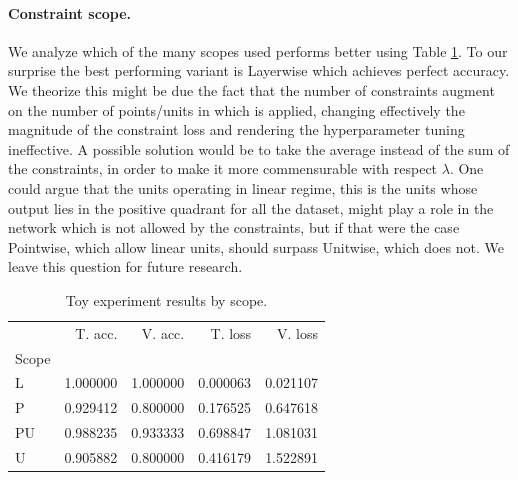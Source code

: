 \paragraph{Constraint scope.} We analyze which of the many scopes used performs better using Table \ref{tab:scopes}. To our surprise the best performing variant is Layerwise which achieves perfect accuracy. We theorize this might be due the fact that the number of constraints augment on the number of points/units in which is applied, changing effectively the magnitude of the constraint loss and rendering the hyperparameter tuning ineffective. A possible solution would be to take the average instead of the sum of the constraints, in order to make it more commensurable with respect $\lambda$. One could argue that the units operating in linear regime, this is the units whose output lies in the positive quadrant for all the dataset, might play a role in the network which is not allowed by the constraints, but if that were the case Pointwise, which allow linear units, should surpass Unitwise, which does not. We leave this question for future research.

\begin{table}[h]
\centering
\begin{tabular}{lrrrr}
{} &       T. acc. &   V. acc. &      T. loss &  V. loss \\
Scope &           &           &           &           \\
L    &  1.000000 &  1.000000 &  0.000063 &  0.021107 \\
P    &  0.929412 &  0.800000 &  0.176525 &  0.647618 \\
PU   &  0.988235 &  0.933333 &  0.698847 &  1.081031 \\
U    &  0.905882 &  0.800000 &  0.416179 &  1.522891 \\
\end{tabular}
\caption{Toy experiment results by scope.}
  \label{tab:scopes}
\end{table}


